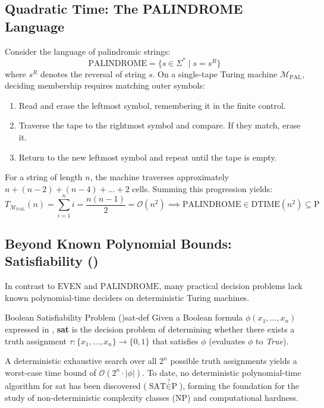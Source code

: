 \subsection{Quadratic Time: The PALINDROME Language}
Consider the language of palindromic strings:
\[
\text{PALINDROME} = \{ s \in \Sigma^* \mid s = s^R \}
\]
where $s^R$ denotes the reversal of string $s$. On a single-tape Turing machine $\mathcal{M}_{\text{PAL}}$, deciding membership requires matching outer symbols:
\begin{enumerate}
    \item Read and erase the leftmost symbol, remembering it in the finite control.
    \item Traverse the tape to the rightmost symbol and compare. If they match, erase it.
    \item Return to the new leftmost symbol and repeat until the tape is empty.
\end{enumerate}
For a string of length $n$, the machine traverses approximately $n + (n-2) + (n-4) + \dots + 2$ cells. Summing this progression yields:
\[
T_{\mathcal{M}_{\text{PAL}}}(n) = \sum_{i=1}^{n} i = \frac{n(n-1)}{2} = \mathcal{O}(n^2) \implies \text{PALINDROME} \in \text{DTIME}(n^2) \subseteq \text{P}
\]

\subsection{Beyond Known Polynomial Bounds: Satisfiability ()}
In contrast to $\text{EVEN}$ and $\text{PALINDROME}$, many practical decision problems lack known polynomial-time deciders on deterministic Turing machines.

\begin{definition}{Boolean Satisfiability Problem ()}{sat-def}
Given a Boolean formula $\phi(x_1, \dots, x_n)$ expressed in , \textbf{\gls{sat}} is the decision problem of determining whether there exists a truth assignment $\tau : \{x_1, \dots, x_n\} \to \{0, 1\}$ that satisfies $\phi$ (evaluates $\phi$ to \textit{True}).
\end{definition}

A deterministic exhaustive search over all $2^n$ possible truth assignments yields a worst-case time bound of $\mathcal{O}(2^n \cdot |\phi|)$. To date, no deterministic polynomial-time algorithm for \gls{sat} has been discovered ($\text{SAT} \stackrel{?}{\in} \text{P}$), forming the foundation for the study of non-deterministic complexity classes ($\text{NP}$) and computational hardness.